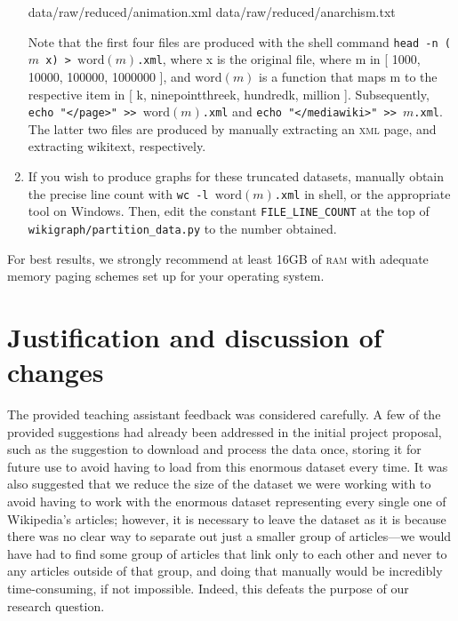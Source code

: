 \documentclass[fontsize=12pt]{article}
\newcommand{\py}[1]{\texttt{#1}}
\begin{document}
\begin{multicols}{2}
\begin{enumerate}
\begin{verbatim*}
data/raw/reduced/animation.xml
data/raw/reduced/anarchism.txt
\end{verbatim*}
    Note that the first four files are produced with the shell command \texttt{head -n (\(m\) x) > \(\text{word}(m)\).xml}, where x is the original file, where m in [ 1000, 10000, 100000, 1000000 ], and \(\text{word}(m)\) is a function that maps m to the respective item in [ k, ninepointthreek, hundredk, million ]. Subsequently, \texttt{echo "</page>" >> \(\text{word}(m)\).xml} and \texttt{echo "</mediawiki>" >> \(m\).xml}. The latter two files are produced by manually extracting an \textsc{xml} page, and extracting wikitext, respectively.
    \item If you wish to produce graphs for these truncated datasets, manually obtain the precise line count with \texttt{wc -l \(\text{word}(m)\).xml} in shell, or the appropriate tool on Windows. Then, edit the constant \py{FILE_LINE_COUNT} at the top of \texttt{wikigraph/partition\_data.py} to the number obtained.
\end{enumerate}

For best results, we strongly recommend at least 16GB of \textsc{ram} with adequate memory paging schemes set up for your operating system. 

    \section{Justification and discussion of changes}
    The provided teaching assistant feedback was considered carefully. A few of the provided suggestions had already been addressed in the initial project proposal, such as the suggestion to download and process the data once, storing it for future use to avoid having to load from this enormous dataset every time. It was also suggested that we reduce the size of the dataset we were working with to avoid having to work with the enormous dataset representing every single one of Wikipedia's articles; however, it is necessary to leave the dataset as it is because there was no clear way to separate out just a smaller group of articles---we would have had to find some group of articles that link only to each other and never to any articles outside of that group, and doing that manually would be incredibly time-consuming, if not impossible. Indeed, this defeats the purpose of our research question.
    

\end{multicols}
\end{document}
